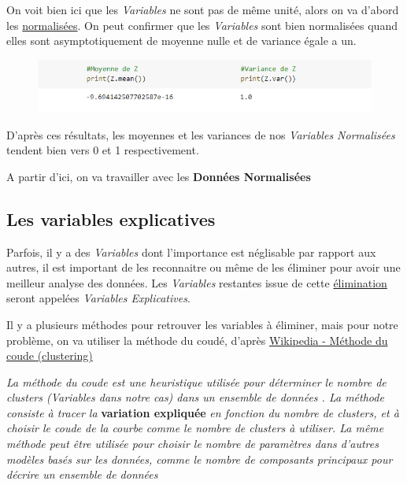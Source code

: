\documentclass{article}
\begin{document}
On voit bien ici que les \textit{Variables} ne sont pas de même unité, alors on va d'abord les \underline{normalisées}. On peut confirmer que les \textit{Variables} sont bien normalisées quand elles sont asymptotiquement de moyenne nulle et de variance égale a un.

\begin{figure}[h!]
\includegraphics[width=\linewidth]{images/mean_variance.png}
\end{figure}

D'après ces résultats, les moyennes et les variances de nos \textit{Variables Normalisées} tendent bien vers 0 et 1 respectivement.
\newline

A partir d'ici, on va travailler avec les \textbf{Données Normalisées} 

\newpage

\subsection{Les variables explicatives}

Parfois, il y a des \textit{Variables} dont l'importance est néglisable par rapport aux autres, il est important de les reconnaitre ou même de les éliminer pour avoir une meilleur analyse des données. Les \textit{Variables} restantes issue de cette \underline{élimination} seront appelées \textit{Variables Explicatives}.
\newline

Il y a plusieurs méthodes pour retrouver les variables à éliminer, mais pour notre problème, on va utiliser la méthode du coudé, d'après \href{https://fr.qaz.wiki/wiki/Elbow_method_(clustering)}{Wikipedia - Méthode du coude (clustering)} 
\newline

\textit{La méthode du coude est une heuristique utilisée pour déterminer le nombre de clusters (Variables dans notre cas) dans un ensemble de données . La méthode consiste à tracer la} \textbf{variation expliquée} \textit{en fonction du nombre de clusters, et à choisir le coude de la courbe comme le nombre de clusters à utiliser. La même méthode peut être utilisée pour choisir le nombre de paramètres dans d'autres modèles basés sur les données, comme le nombre de composants principaux pour décrire un ensemble de données}
\newline
\end{document}
